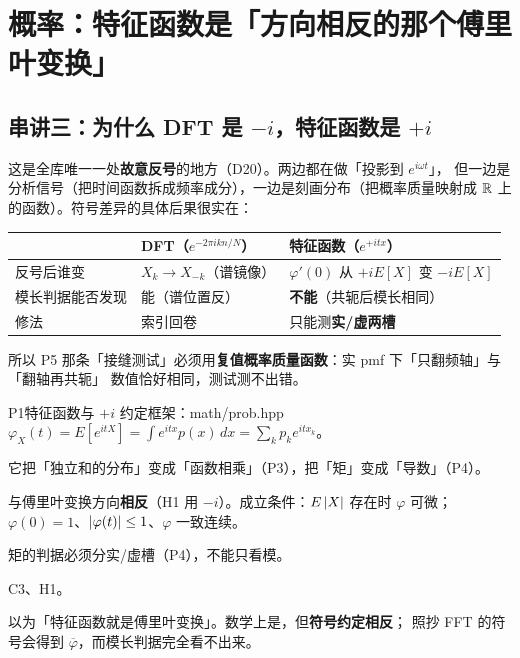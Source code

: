 \section{概率：特征函数是「方向相反的那个傅里叶变换」}

\subsection*{串讲三：为什么 DFT 是 $-i$，特征函数是 $+i$}

这是全库唯一一处\textbf{故意反号}的地方（D20）。两边都在做「投影到 $e^{i\omega t}$」，
但一边是分析信号（把时间函数拆成频率成分），一边是刻画分布（把概率质量映射成
$\mathbb{R}$ 上的函数）。符号差异的具体后果很实在：

\begin{center}
\begin{tabular}{L{3.2cm}L{4.9cm}L{5.1cm}}
\toprule
 & DFT（$e^{-2\pi ikn/N}$） & 特征函数（$e^{+itx}$） \\
\midrule
反号后谁变 & $X_k\to X_{-k}$（谱镜像） & $\varphi'(0)$ 从 $+iE[X]$ 变 $-iE[X]$ \\
模长判据能否发现 & 能（谱位置反） & \textbf{不能}（共轭后模长相同） \\
修法 & 索引回卷 & 只能测\textbf{实/虚两槽} \\
\bottomrule
\end{tabular}
\end{center}

所以 P5 那条「接缝测试」必须用\textbf{复值概率质量函数}：实 pmf 下「只翻频轴」与「翻轴再共轭」
数值恰好相同，测试测不出错。

\begin{know}{P1}{特征函数与 $+i$ 约定}{框架：math/prob.hpp}
 $\varphi_X(t)=E[e^{itX}]=\int e^{itx}p(x)\,dx=\sum_k p_ke^{itx_k}$。

 它把「独立和的分布」变成「函数相乘」（P3），把「矩」变成「导数」（P4）。

 与傅里叶变换方向\textbf{相反}（H1 用 $-i$）。成立条件：$E\left\lvert X\right\rvert$ 存在时 $\varphi$
可微；$\varphi(0)=1$、$\left\lvert \varphi(t)\right\rvert\le1$、$\varphi$ 一致连续。

 矩的判据必须分实/虚槽（P4），不能只看模。

 C3、H1。

 以为「特征函数就是傅里叶变换」。数学上是，但\textbf{符号约定相反}；
照抄 FFT 的符号会得到 $\overline{\varphi}$，而模长判据完全看不出来。
\end{know}

